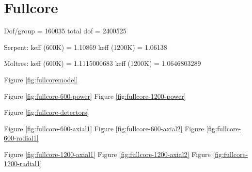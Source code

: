 \documentclass[11pt,letterpaper]{article}
\begin{document}
\section{Fullcore}

Dof/group = 160035
total dof = 2400525

Serpent: 
keff (600K) = 1.10869
keff (1200K) = 1.06138

Moltres:
keff (600K) = 1.1115000683
keff (1200K) = 1.0646803289


Figure \ref{fig:fullcoremodel}

Figure \ref{fig:fullcore-600-power}
Figure \ref{fig:fullcore-1200-power}

Figure \ref{fig:fullcore-detectors}

Figure \ref{fig:fullcore-600-axial1}
Figure \ref{fig:fullcore-600-axial2}
Figure \ref{fig:fullcore-600-radial1}

Figure \ref{fig:fullcore-1200-axial1}
Figure \ref{fig:fullcore-1200-axial2}
Figure \ref{fig:fullcore-1200-radial1}
\end{document}
